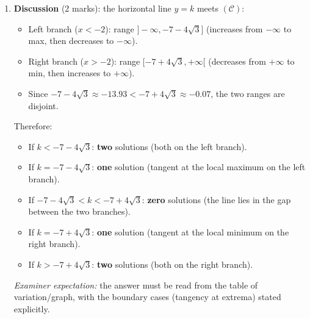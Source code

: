 \documentclass[11pt]{article}
\begin{document}
\begin{corrige}
\begin{enumerate}
\item \textbf{Discussion} (2 marks): the horizontal line $y=k$ meets $(\mathcal{C})$:
\begin{itemize}
\item Left branch ($x<-2$): range $]-\infty, -7-4\sqrt{3}]$ (increases from $-\infty$ to max, then decreases to $-\infty$).
\item Right branch ($x>-2$): range $[-7+4\sqrt{3}, +\infty[$ (decreases from $+\infty$ to min, then increases to $+\infty$).
\item Since $-7-4\sqrt{3} \approx -13.93 < -7+4\sqrt{3} \approx -0.07$, the two ranges are disjoint.
\end{itemize}
Therefore:
\begin{itemize}
\item If $k < -7-4\sqrt{3}$: \textbf{two} solutions (both on the left branch).
\item If $k = -7-4\sqrt{3}$: \textbf{one} solution (tangent at the local maximum on the left branch).
\item If $-7-4\sqrt{3} < k < -7+4\sqrt{3}$: \textbf{zero} solutions (the line lies in the gap between the two branches).
\item If $k = -7+4\sqrt{3}$: \textbf{one} solution (tangent at the local minimum on the right branch).
\item If $k > -7+4\sqrt{3}$: \textbf{two} solutions (both on the right branch).
\end{itemize}
\emph{Examiner expectation:} the answer must be read from the table of variation/graph, with the boundary cases (tangency at extrema) stated explicitly.
\end{enumerate}
\end{corrige}
\end{document}
